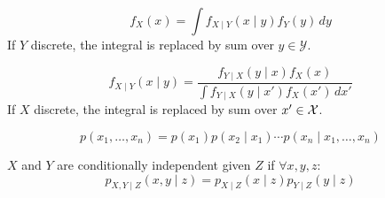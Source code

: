 \begin{theorem*} \vspace{-5pt}
  \[f_X(x) = \int f_{X \mid Y}(x \mid y) f_Y(y) \, dy\]
  If \(Y\) discrete, the integral is replaced by sum over \(y \in \mathcal{Y}\).
\end{theorem*}

\begin{theorem*} \vspace{-5pt}
  \[f_{X \mid Y}(x \mid y) = \frac{f_{Y \mid X}(y \mid x) f_X(x)}{\int f_{Y \mid X}(y \mid x') f_X(x') \, dx'}\]
  If \(X\) discrete, the integral is replaced by sum over \(x' \in \operatorname{\mathcal{X}}\).
\end{theorem*}

\begin{theorem*} \vspace{-5pt}
  \[p(x_1, \ldots, x_n) = p(x_1) p(x_2 \mid x_1) \cdots p(x_n \mid x_1, \ldots, x_n)\]
\end{theorem*}

\begin{theorem*}
  \(X\) and \(Y\) are conditionally independent given \(Z\) if \(\forall x, y, z\):
  \[p_{X, Y \mid Z}(x, y \mid z) = p_{X \mid Z}(x \mid z) p_{Y \mid Z}(y \mid z)\]
\end{theorem*}
